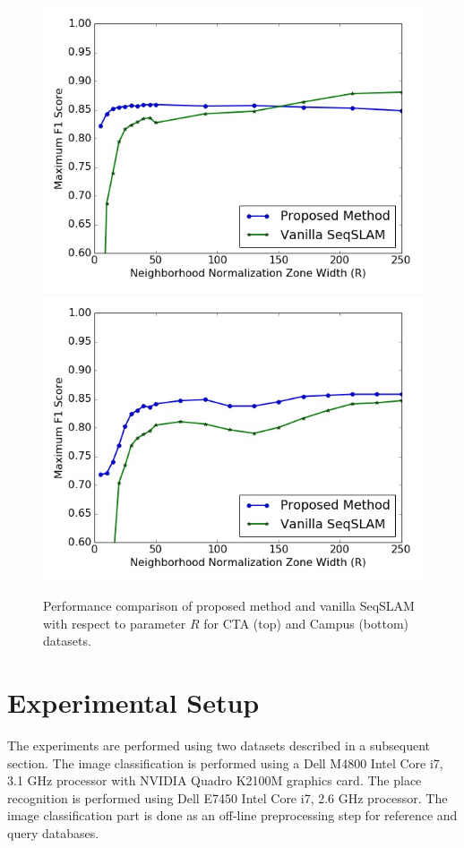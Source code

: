 \documentclass[letterpaper, 10 pt, conference]{ieeeconf}  %
\begin{document}
\begin{figure}
 \includegraphics[scale=0.4]{RPerformance1} \\
 \includegraphics[scale=0.4]{RPerformance2}
 \caption{Performance comparison of proposed method and vanilla SeqSLAM with respect to parameter $R$ for CTA (top) and Campus (bottom) datasets.}
 \label{fig:RPerformance}
\end{figure}


\section{Experimental Setup}
The experiments are performed using two datasets described in a subsequent section. The image classification is performed using a Dell M4800 Intel Core i7, 3.1 GHz processor with NVIDIA Quadro K2100M graphics card. The place recognition is performed using Dell E7450 Intel Core i7, 2.6 GHz processor. The image classification part is done as an off-line preprocessing step for reference and query databases.
\end{document}
